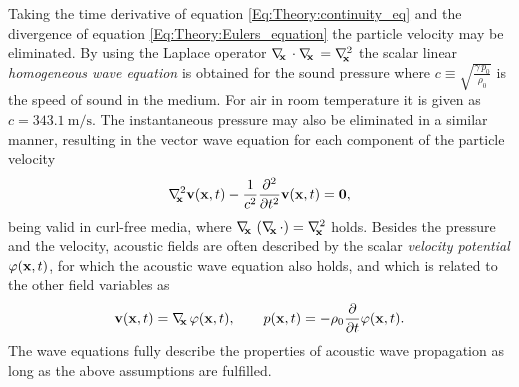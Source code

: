 %
%
Taking the time derivative of equation \eqref{Eq:Theory:continuity_eq} and the divergence of equation \eqref{Eq:Theory:Eulers_equation} the particle velocity may be eliminated. 
By using the Laplace operator $\nabla_{\!\!\mathbf{x}}\, \cdot \nabla_{\!\!\mathbf{x}}\, = \nabla^2_{\!\!\mathbf{x}}$ the scalar linear \emph{homogeneous wave equation} is obtained for the sound pressure
where $c \equiv \sqrt{ \frac{\gamma \, p_0}{\rho_0} }$ is the speed of sound in the medium. 
For air in room temperature it is given as $c = 343.1 ~ \mathrm{m}/\mathrm{s}$.
The instantaneous pressure may also be eliminated in a similar manner, resulting in the vector wave equation for each component of the particle velocity
\begin{equation}
\nabla^2_{\!\!\mathbf{x}} \mathbf{v}(\mathbf{x},t) - \frac{1}{c^2} \frac{\partial^2}{\partial t^2} \mathbf{v}(\mathbf{x},t) = \mathbf{0},
\label{Eq:Theory:Vector_wave_equation}
\end{equation}
being valid in curl-free media, where $\nabla_{\!\!\mathbf{x}}\, \left( \nabla_{\!\!\mathbf{x}}\, \cdot \right) = \nabla^2_{\!\!\mathbf{x}}$ holds.
%
Besides the pressure and the velocity, acoustic fields are often described by the scalar \emph{velocity potential} $\varphi(\mathbf{x},t)$, for which the acoustic wave equation also holds, and which is related to the other field variables as 
\begin{equation}
\mathbf{v}(\mathbf{x},t) = \nabla_{\!\!\mathbf{x}}\, \varphi(\mathbf{x},t), \hspace{7mm} p(\mathbf{x},t) = -\rho_0 \frac{\partial}{\partial t} \varphi(\mathbf{x},t).
\label{eq:theory:velocity_potential_definition}
\end{equation}
%
The wave equations fully describe the properties of acoustic wave propagation as long as the above assumptions are fulfilled.

